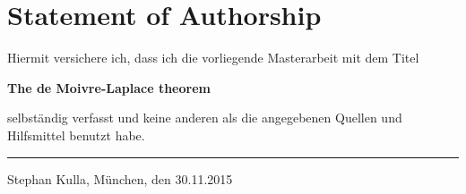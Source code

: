 \cleardoublepage
{} \label{statement_of_authorship}

\chapter*{Statement of Authorship}

Hiermit versichere ich, dass ich die vorliegende Masterarbeit mit dem Titel

\begin{center}
\textbf{The de Moivre-Laplace theorem}
\end{center}

\noindent selbständig verfasst und keine anderen als die angegebenen Quellen und Hilfsmittel benutzt habe.

\vspace*{2cm}

\noindent\rule{0.3\textwidth}{0.4pt}

\noindent Stephan Kulla, \newline 
München, den 30.11.2015
